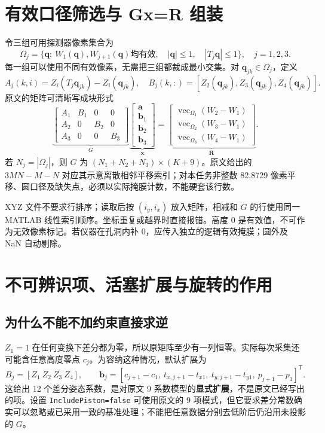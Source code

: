 \documentclass[UTF8,a4paper,zihao=-4]{ctexart}
\begin{document}
\section{有效口径筛选与 Gx=R 组装}
令三组可用探测器像素集合为
\begin{equation}
\Omega_j=\{\bm q:\ W_1(\bm q),W_{j+1}(\bm q)\text{均有效},\quad
|\bm q|\le1,\quad|T_j\bm q|\le1\},\quad j=1,2,3.
\end{equation}
每一组可以使用不同有效像素，无需把三组都裁成最小交集。对 $\bm q_{jk}\in\Omega_j$，定义
\begin{equation}
A_j(k,i)=Z_i(T_j\bm q_{jk})-Z_i(\bm q_{jk}),\quad
B_j(k,:)=[Z_2(\bm q_{jk}),Z_3(\bm q_{jk}),Z_4(\bm q_{jk})].
\end{equation}
原文的矩阵可清晰写成块形式
\begin{equation}
\underbrace{\begin{bmatrix}
A_1&B_1&0&0\\ A_2&0&B_2&0\\ A_3&0&0&B_3
\end{bmatrix}}_{G}
\underbrace{\begin{bmatrix}\bm a\\\bm b_1\\\bm b_2\\\bm b_3\end{bmatrix}}_{\bm x}
=
\underbrace{\begin{bmatrix}
\operatorname{vec}_{\Omega_1}(W_2-W_1)\\
\operatorname{vec}_{\Omega_2}(W_3-W_1)\\
\operatorname{vec}_{\Omega_3}(W_4-W_1)
\end{bmatrix}}_{\bm R}.\tag{原10--13}
\end{equation}
若 $N_j=|\Omega_j|$，则 $G$ 为 $(N_1+N_2+N_3)\times(K+9)$。原文给出的 $3MN-M-N$ 对应其示意离散相邻平移索引；对本任务非整数 82.8729 像素平移、圆口径及缺失点，必须以实际掩膜计数，不能硬套该行数。

XYZ 文件不要求行排序；读取后按 $(i_y,i_x)$ 放入矩阵，相减和 $G$ 的行使用同一 MATLAB 线性索引顺序。坐标重复或越界时直接报错。高度 0 是有效值，不可作为无效像素标记。若仪器在孔洞内补 0，应传入独立的逻辑有效掩膜；圆外及 NaN 自动剔除。

\section{不可辨识项、活塞扩展与旋转的作用}
\subsection{为什么不能不加约束直接求逆}
$Z_1=1$ 在任何变换下差分都为零，所以原矩阵至少有一列恒零。实际每次采集还可能含任意高度零点 $c_j$。为容纳这种情况，默认扩展为
\begin{equation}
B_j=[Z_1\ Z_2\ Z_3\ Z_4],\qquad
\bm b_j=[c_{j+1}-c_1,\ t_{x,j+1}-t_{x1},\ t_{y,j+1}-t_{y1},\ p_{j+1}-p_1]^{\mathsf T}.
\end{equation}
这给出 12 个差分姿态系数，是对原文 9 系数模型的\textbf{显式扩展}，不是原文已经写出的项。设置 \texttt{IncludePiston=false} 可使用原文的 9 项模式，但它要求差分常数确实可以忽略或已采用一致的基准处理；不能把任意数据分别去低阶后仍沿用未投影的 $G$。
\end{document}
